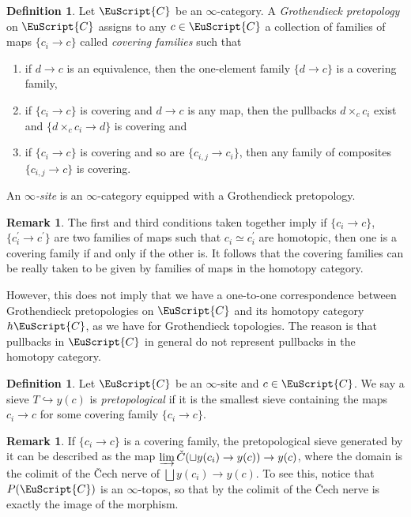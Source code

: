 \documentclass[oneside,a4paper]{amsart}
\newcommand{\euscr}[1]{\EuScript{#1}} %
\newcommand{\ccat}{\euscr{C}} %
\theoremstyle{plain}
\theoremstyle{definition}
\newtheorem{defin}[thm]{Definition}
\newtheorem{rem}[thm]{Remark}
\theoremstyle{remark}
\begin{document}
\begin{defin}
Let $\ccat$ be an $\infty$-category. A \emph{Grothendieck pretopology} on $\ccat$ assigns to any $c \in \ccat$ a collection of families of maps $\{ c_{i} \rightarrow c \}$ called \emph{covering families} such that

\begin{enumerate}
\item if $d \rightarrow c$ is an equivalence, then the one-element family $\{ d \rightarrow c \}$ is a covering family,
\item if $\{ c_{i} \rightarrow c \}$ is covering and $d \rightarrow c$ is any map, then the pullbacks $d \times _{c} c_{i}$ exist and $\{ d \times _{c} c_{i} \rightarrow d \}$ is covering and 
\item if $\{ c_{i} \rightarrow c \}$ is covering and so are $\{ c_{i, j} \rightarrow c_{i} \}$, then any family of composites $\{ c_{i, j} \rightarrow c \}$ is covering.
\end{enumerate}
An \emph{$\infty$-site} is an $\infty$-category equipped with a Grothendieck pretopology. 
\end{defin}

\begin{rem}
The first and third conditions taken together imply if $\{ c_{i} \rightarrow c \}$, $\{ c^\prime_{i} \rightarrow c^\prime \}$ are two families of maps such that $c_{i} \simeq c^\prime_{i}$ are homotopic, then one is a covering family if and only if the other is. It follows that the covering families can be really taken to be given by families of maps in the homotopy category. 

However, this does not imply that we have a one-to-one correspondence between Grothendieck pretopologies on $\ccat$ and its homotopy category $h\ccat$, as we have for Grothendieck topologies. The reason is that pullbacks in $\ccat$ in general do not represent pullbacks in the homotopy category. 
\end{rem}

\begin{defin}
Let $\ccat$ be an $\infty$-site and $c \in \ccat$. We say a sieve $T \hookrightarrow y(c)$ is \emph{pretopological} if it is the smallest sieve containing the maps $c_{i} \rightarrow c$ for some covering family $\{ c_{i} \rightarrow c \}$.
\end{defin}

\begin{rem}
\label{rem:description_of_pretopological_sieves}
If $\{ c_{i} \rightarrow c \}$ is a covering family, the pretopological sieve generated by it can be described as the map $\varinjlim \check{C}(\sqcup y(c_{i}) \rightarrow y(c)) \rightarrow y(c)$, where the domain is the colimit of the \v{C}ech nerve of $\bigsqcup y(c_{i}) \rightarrow y(c)$. To see this, notice that $P(\ccat)$ is an $\infty$-topos, so that by \cite[6.2.3.4]{lurie_higher_topos_theory} the colimit of the \v{C}ech nerve is exactly the image of the morphism. 
\end{rem}
\end{document}
